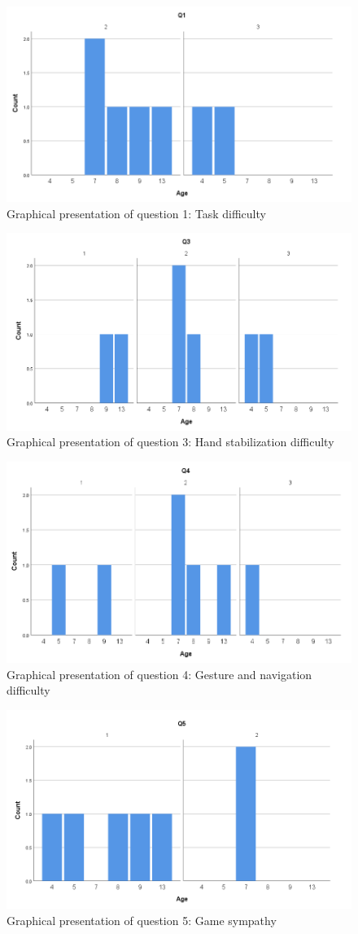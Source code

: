\begin{figure}[!ht]
    \centering
    \includegraphics[width=.6\textwidth]{figures/Q1.png}
    \caption{Graphical presentation of question 1: Task difficulty}
    \label{fig:Q1}
\end{figure}
\begin{figure}[!ht]
    \centering
    \includegraphics[width=.6\textwidth]{figures/Q3.png}
    \caption{Graphical presentation of question 3: Hand stabilization difficulty}
    \label{fig:Q3}
\end{figure}
\begin{figure}[!ht]
    \centering
    \includegraphics[width=.6\textwidth]{figures/Q4.png}
    \caption{Graphical presentation of question 4: Gesture and navigation difficulty}
    \label{fig:Q4}
\end{figure}
\begin{figure}[!ht]
    \centering
    \includegraphics[width=.6\textwidth]{figures/Q5.png}
    \caption{Graphical presentation of question 5: Game sympathy }
    \label{fig:Q5}
\end{figure}



